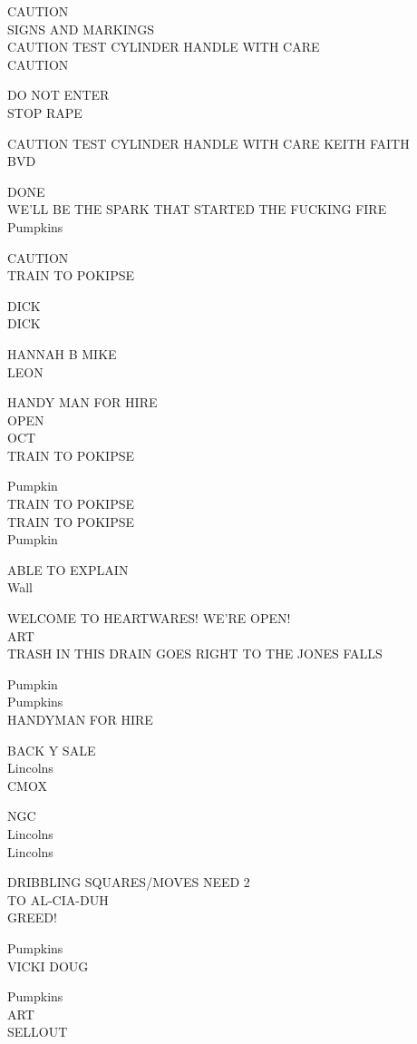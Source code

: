 \documentclass[10pt,letterpaper]{article}
\begin{document}
CAUTION\\
SIGNS AND MARKINGS\\
CAUTION TEST CYLINDER HANDLE WITH CARE\\
CAUTION

DO NOT ENTER\\
STOP RAPE

CAUTION TEST CYLINDER HANDLE WITH CARE KEITH FAITH\\
BVD

DONE\\
WE'LL BE THE SPARK THAT STARTED THE FUCKING FIRE\\
Pumpkins

CAUTION\\
TRAIN TO POKIPSE

DICK\\
DICK

HANNAH B MIKE\\
LEON

HANDY MAN FOR HIRE\\
OPEN\\
OCT\\
TRAIN TO POKIPSE

Pumpkin\\
TRAIN TO POKIPSE\\
TRAIN TO POKIPSE\\
Pumpkin

ABLE TO EXPLAIN\\
Wall

WELCOME TO HEARTWARES!  WE'RE OPEN!\\
ART\\
TRASH IN THIS DRAIN GOES RIGHT TO THE JONES FALLS

Pumpkin\\
Pumpkins\\
HANDYMAN FOR HIRE

BACK Y SALE\\
Lincolns\\
CMOX

NGC\\
Lincolns\\
Lincolns

DRIBBLING SQUARES/MOVES NEED 2\\
TO AL{-}CIA{-}DUH\\
GREED!

Pumpkins\\
VICKI DOUG

Pumpkins\\
ART\\
SELLOUT
\end{document}
